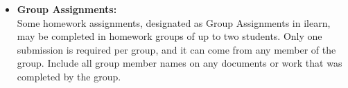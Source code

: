 \documentclass[12pt]{article}
\begin{document}
\begin{itemize}
   	\item {\bf Group Assignments:} \vspace{2mm} 
   \\
   Some homework assignments, designated as Group Assignments in ilearn, may be completed in homework groups of up to two students. Only one submission is required per group, and it can come from any member of the group. Include all group member names on any documents or work that was completed by the group.         
           
            
        
    \end{itemize}

    
\end{document}
